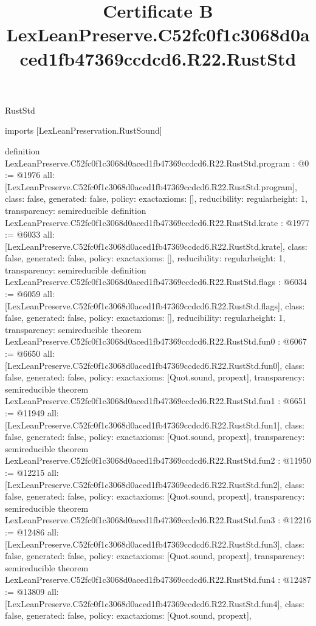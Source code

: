 \begin{lexlean}{RustStd}
\title{Certificate B LexLeanPreserve.C52fc0f1c3068d0aced1fb47369ccdcd6.R22.RustStd}
\begin{coremodule}
imports [LexLeanPreservation.RustSound]

definition LexLeanPreserve.C52fc0f1c3068d0aced1fb47369ccdcd6.R22.RustStd.program : @0 := @1976 {
  all: [LexLeanPreserve.C52fc0f1c3068d0aced1fb47369ccdcd6.R22.RustStd.program],
  class: false,
  generated: false,
  policy: exact{axioms: []},
  reducibility: regular{height: 1},
  transparency: semireducible
}
definition LexLeanPreserve.C52fc0f1c3068d0aced1fb47369ccdcd6.R22.RustStd.krate : @1977 := @6033 {
  all: [LexLeanPreserve.C52fc0f1c3068d0aced1fb47369ccdcd6.R22.RustStd.krate],
  class: false,
  generated: false,
  policy: exact{axioms: []},
  reducibility: regular{height: 1},
  transparency: semireducible
}
definition LexLeanPreserve.C52fc0f1c3068d0aced1fb47369ccdcd6.R22.RustStd.flags : @6034 := @6059 {
  all: [LexLeanPreserve.C52fc0f1c3068d0aced1fb47369ccdcd6.R22.RustStd.flags],
  class: false,
  generated: false,
  policy: exact{axioms: []},
  reducibility: regular{height: 1},
  transparency: semireducible
}
theorem LexLeanPreserve.C52fc0f1c3068d0aced1fb47369ccdcd6.R22.RustStd.fun0 : @6067 := @6650 {
  all: [LexLeanPreserve.C52fc0f1c3068d0aced1fb47369ccdcd6.R22.RustStd.fun0],
  class: false,
  generated: false,
  policy: exact{axioms: [Quot.sound, propext]},
  transparency: semireducible
}
theorem LexLeanPreserve.C52fc0f1c3068d0aced1fb47369ccdcd6.R22.RustStd.fun1 : @6651 := @11949 {
  all: [LexLeanPreserve.C52fc0f1c3068d0aced1fb47369ccdcd6.R22.RustStd.fun1],
  class: false,
  generated: false,
  policy: exact{axioms: [Quot.sound, propext]},
  transparency: semireducible
}
theorem LexLeanPreserve.C52fc0f1c3068d0aced1fb47369ccdcd6.R22.RustStd.fun2 : @11950 := @12215 {
  all: [LexLeanPreserve.C52fc0f1c3068d0aced1fb47369ccdcd6.R22.RustStd.fun2],
  class: false,
  generated: false,
  policy: exact{axioms: [Quot.sound, propext]},
  transparency: semireducible
}
theorem LexLeanPreserve.C52fc0f1c3068d0aced1fb47369ccdcd6.R22.RustStd.fun3 : @12216 := @12486 {
  all: [LexLeanPreserve.C52fc0f1c3068d0aced1fb47369ccdcd6.R22.RustStd.fun3],
  class: false,
  generated: false,
  policy: exact{axioms: [Quot.sound, propext]},
  transparency: semireducible
}
theorem LexLeanPreserve.C52fc0f1c3068d0aced1fb47369ccdcd6.R22.RustStd.fun4 : @12487 := @13809 {
  all: [LexLeanPreserve.C52fc0f1c3068d0aced1fb47369ccdcd6.R22.RustStd.fun4],
  class: false,
  generated: false,
  policy: exact{axioms: [Quot.sound, propext]},
}
\end{coremodule}
\end{lexlean}
